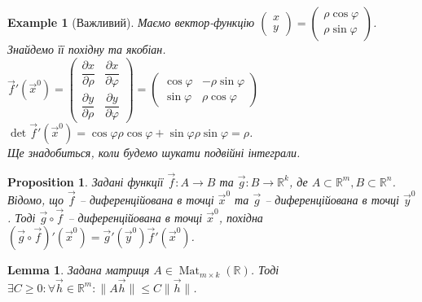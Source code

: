 \documentclass[a4paper, 10pt]{article}
\def\departial#1#2{\dfrac{\partial {#1}}{\partial {#2}}}
\theoremstyle{theoremdd}
\theoremstyle{theoremdd}
\theoremstyle{theoremdd}
\theoremstyle{theoremdd}
\theoremstyle{theoremdd}
\newtheorem{example}[theorem]{Example}
\theoremstyle{theoremdd}
\newtheorem{proposition}[theorem]{Proposition}
\theoremstyle{theoremdd}
\theoremstyle{theoremdd}
\newtheorem{lemma}[theorem]{Lemma}
\theoremstyle{theoremdd}
\newcommand\Norm[1]{\|#1\|}
\DeclareMathOperator{\Mat}{Mat}
\begin{document}
\begin{example}[Важливий]
Маємо вектор-функцію $\begin{pmatrix}
x \\ y
\end{pmatrix} = \begin{pmatrix}
\rho \cos \varphi \\
\rho \sin \varphi
\end{pmatrix}$. Знайдемо її похідну та якобіан.\\
$\vec{f}'(\vec{x}^0) = \begin{pmatrix}
\departial{x}{\rho} & \departial{x}{\varphi} \\
\departial{y}{\rho} & \departial{y}{\varphi}
\end{pmatrix} = \begin{pmatrix}
\cos \varphi & -\rho \sin \varphi \\
\sin \varphi & \rho \cos \varphi
\end{pmatrix}$ \qquad $\det \vec{f}'(\vec{x}^0) = \cos \varphi \rho \cos \varphi + \sin \varphi \rho \sin \varphi = \rho$.\\
Ще знадобиться, коли будемо шукати подвійні інтеграли.
\end{example}

\begin{proposition}
Задані функції $\vec{f}\colon A \to B$ та $\vec{g}\colon B \to \mathbb{R}^k$, де $A \subset \mathbb{R}^m, B \subset \mathbb{R}^n$. Відомо, що $\vec{f}$ -- диференційована в точці $\vec{x}^0$ та $\vec{g}$ -- диференційована в точці $\vec{y}^0$. Тоді $\vec{g} \circ \vec{f}$ -- диференційована в точці $\vec{x}^0$, похідна $(\vec{g} \circ \vec{f})'(\vec{x}^0) = \vec{g}'(\vec{y}^0) \vec{f}'(\vec{x}^0)$.
\end{proposition}

\begin{lemma}
\label{bounded_matrix}
Задана матриця $A \in \Mat_{m \times k}(\mathbb{R})$. Тоді $\exists C \geq 0: \forall \vec{h} \in \mathbb{R}^m: \Norm{A \vec{h}} \leq C \Norm{\vec{h}}$.
\end{lemma}
\end{document}
